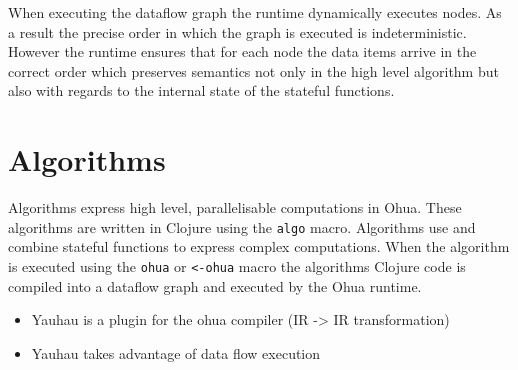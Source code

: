 When executing the dataflow graph the runtime dynamically executes nodes.
As a result the precise order in which the graph is executed is indeterministic.
However the runtime ensures that for each node the data items arrive in the correct order which preserves semantics not only in the high level algorithm but also with regards to the internal state of the stateful functions.

\section{Algorithms}

Algorithms express high level, parallelisable computations in Ohua.
These algorithms are written in Clojure using the \texttt{algo} macro.
Algorithms use and combine stateful functions to express complex computations.
When the algorithm is executed using the \texttt{ohua} or \texttt{<-ohua} macro the algorithms Clojure code is compiled into a dataflow graph and executed by the Ohua runtime.

\begin{itemize}
	\item Yauhau is a plugin for the ohua compiler (IR -> IR transformation)
	\item Yauhau takes advantage of data flow execution
\end{itemize}
